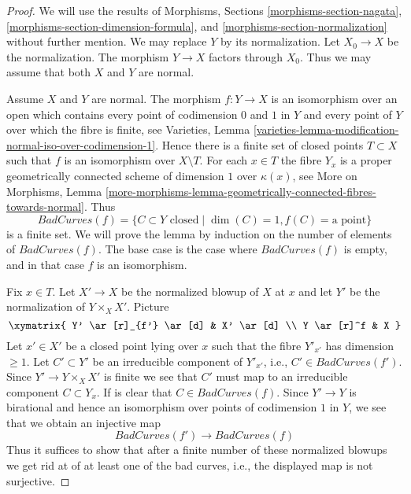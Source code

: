\begin{proof}
We will use the results of Morphisms, Sections
\ref{morphisms-section-nagata},
\ref{morphisms-section-dimension-formula}, and
\ref{morphisms-section-normalization} without further mention.
We may replace $Y$ by its normalization. Let $X_0 \to X$
be the normalization. The morphism $Y \to X$ factors through $X_0$.
Thus we may assume that both $X$ and $Y$ are normal.

\medskip\noindent
Assume $X$ and $Y$ are normal. The morphism $f : Y \to X$ is an isomorphism
over an open which contains every point of codimension $0$ and $1$ in $Y$ and
every point of $Y$ over which the fibre is finite, see Varieties, Lemma
\ref{varieties-lemma-modification-normal-iso-over-codimension-1}.
Hence there is a finite set of closed points $T \subset X$
such that $f$ is an isomorphism over $X \setminus T$. For each $x \in T$
the fibre $Y_x$ is a proper geometrically connected scheme of dimension $1$
over $\kappa(x)$, see
More on Morphisms, Lemma
\ref{more-morphisms-lemma-geometrically-connected-fibres-towards-normal}.
Thus
$$
BadCurves(f) = \{C \subset Y\text{ closed} \mid
\dim(C) = 1, f(C) = \text{a point}\}
$$
is a finite set. We will prove the lemma by induction on the number
of elements of $BadCurves(f)$. The base case is the case where $BadCurves(f)$
is empty, and in that case $f$ is an isomorphism.

\medskip\noindent
Fix $x \in T$. Let $X' \to X$ be the normalized blowup of $X$ at $x$ and let
$Y'$ be the normalization of $Y \times_X X'$. Picture
$$
\xymatrix{
Y' \ar[r]_{f'} \ar[d] & X' \ar[d] \\
Y \ar[r]^f & X
}
$$
Let $x' \in X'$ be a closed point lying over $x$ such that
the fibre $Y'_{x'}$ has dimension $\geq 1$. Let $C' \subset Y'$
be an irreducible component of $Y'_{x'}$, i.e., $C' \in BadCurves(f')$.
Since $Y' \to Y \times_X X'$ is finite we see that $C'$ must map
to an irreducible component $C \subset Y_x$.
If is clear that $C \in BadCurves(f)$.
Since $Y' \to Y$ is birational and hence an isomorphism over points of
codimension $1$ in $Y$, we see that we obtain an injective map
$$
BadCurves(f') \longrightarrow BadCurves(f)
$$
Thus it suffices to show that after a finite number of these
normalized blowups we get rid at of at least one of the bad
curves, i.e., the displayed map is not surjective.


\end{proof}
